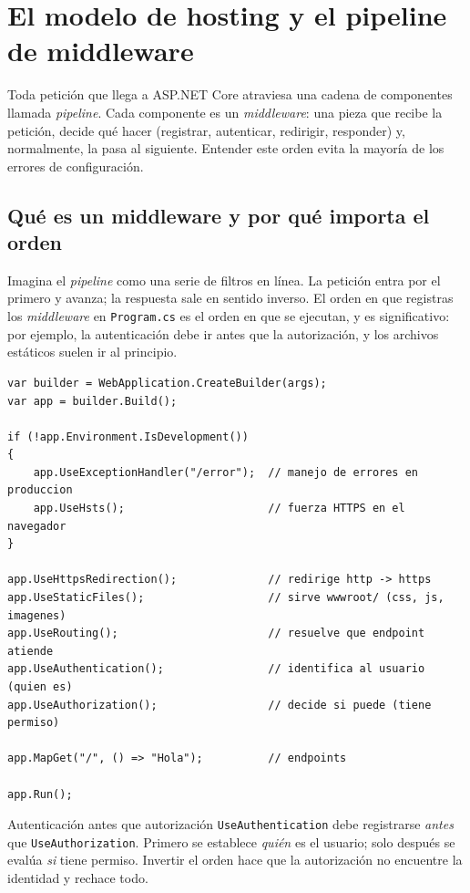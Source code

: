 \documentclass[11pt]{article}
\begin{document}
\section{El modelo de hosting y el pipeline de middleware}
Toda petición que llega a ASP.NET Core atraviesa una cadena de componentes llamada \emph{pipeline}. Cada componente es un \emph{middleware}: una pieza que recibe la petición, decide qué hacer (registrar, autenticar, redirigir, responder) y, normalmente, la pasa al siguiente. Entender este orden evita la mayoría de los errores de configuración.

\subsection{Qué es un middleware y por qué importa el orden}
Imagina el \emph{pipeline} como una serie de filtros en línea. La petición entra por el primero y avanza; la respuesta sale en sentido inverso. El orden en que registras los \emph{middleware} en \texttt{Program.cs} es el orden en que se ejecutan, y es significativo: por ejemplo, la autenticación debe ir antes que la autorización, y los archivos estáticos suelen ir al principio.

\begin{cajacodigo}
\begin{lstlisting}[style=cs]
var builder = WebApplication.CreateBuilder(args);
var app = builder.Build();

if (!app.Environment.IsDevelopment())
{
    app.UseExceptionHandler("/error");  // manejo de errores en produccion
    app.UseHsts();                      // fuerza HTTPS en el navegador
}

app.UseHttpsRedirection();              // redirige http -> https
app.UseStaticFiles();                   // sirve wwwroot/ (css, js, imagenes)
app.UseRouting();                       // resuelve que endpoint atiende
app.UseAuthentication();                // identifica al usuario (quien es)
app.UseAuthorization();                 // decide si puede (tiene permiso)

app.MapGet("/", () => "Hola");          // endpoints

app.Run();
\end{lstlisting}
\end{cajacodigo}
\vspace{2pt}
\begin{cajawarn}{Autenticación antes que autorización}
\texttt{UseAuthentication} debe registrarse \emph{antes} que \texttt{UseAuthorization}. Primero se establece \emph{quién} es el usuario; solo después se evalúa \emph{si} tiene permiso. Invertir el orden hace que la autorización no encuentre la identidad y rechace todo.\par
\end{cajawarn}
\end{document}
